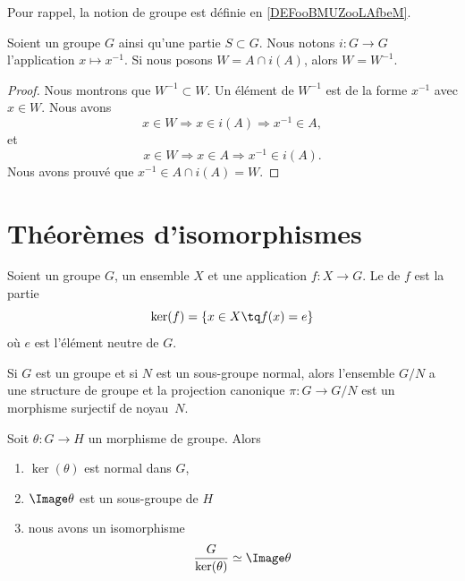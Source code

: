 Pour rappel, la notion de groupe est définie en \ref{DEFooBMUZooLAfbeM}.


\begin{lemma}	\label{LEMooQYETooZsTFMg}
	Soient un groupe \( G\) ainsi qu'une partie \( S\subset G\). Nous notons \(i \colon G\to G  \) l'application \( x\mapsto x^{-1}\). Si nous posons \( W=A\cap i(A)\), alors \( W=W^{-1}\).
\end{lemma}

\begin{proof}
	Nous montrons que \( W^{-1}\subset W\). Un élément de \( W^{-1}\) est de la forme \( x^{-1}\) avec \( x\in W\). Nous avons
	\begin{equation}
		x\in W\Rightarrow x\in i(A)\Rightarrow x^{-1}\in A,
	\end{equation}
	et
	\begin{equation}
		x\in W\Rightarrow x\in A\Rightarrow x^{-1}\in i(A).
	\end{equation}
	Nous avons prouvé que \( x^{-1}\in A\cap i(A)=W\).
\end{proof}


\section{Théorèmes d'isomorphismes}

\begin{definition}      \label{DEFooWBIYooGNRYOp}
	Soient un groupe \( G\), un ensemble \( X\) et une application \( f\colon X\to G\). Le  de \( f\) est la partie
	\begin{equation}
		\ker(f)=\{ x\in X\tq f(x)=e \}
	\end{equation}
	où \( e\) est l'élément neutre de \( G\).
\end{definition}

Si \( G\) est un groupe et si \( N\) est un sous-groupe normal, alors l'ensemble \( G/N\) a une structure de groupe et la projection canonique \( \pi\colon G\to G/N\) est un morphisme surjectif de noyau~\( N\).

\begin{theorem}        \label{ThoPremierthoisomo}
	Soit \( \theta\colon G\to H\) un morphisme de groupe. Alors
	\begin{enumerate}
		\item
		      \( \ker(\theta)\) est normal dans \( G\),
		\item
		      \( \Image \theta\) est un sous-groupe de \( H\)
		\item   \label{ItemWLCLdk}
		      nous avons un isomorphisme
		      \begin{equation}
			      \frac{ G }{ \ker(\theta) }   \simeq \Image\theta
		      \end{equation}
	\end{enumerate}
\end{theorem}

